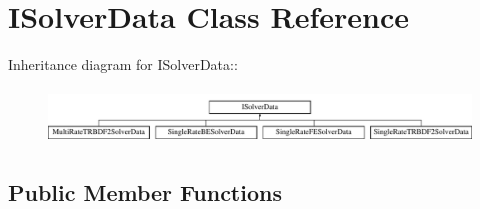 \hypertarget{classISolverData}{
\section{ISolverData Class Reference}
\label{classISolverData}
}
Inheritance diagram for ISolverData::\begin{figure}[H]
\begin{center}
\leavevmode
\includegraphics[height=1.47368cm]{classISolverData}
\end{center}
\end{figure}
\subsection*{Public Member Functions}

